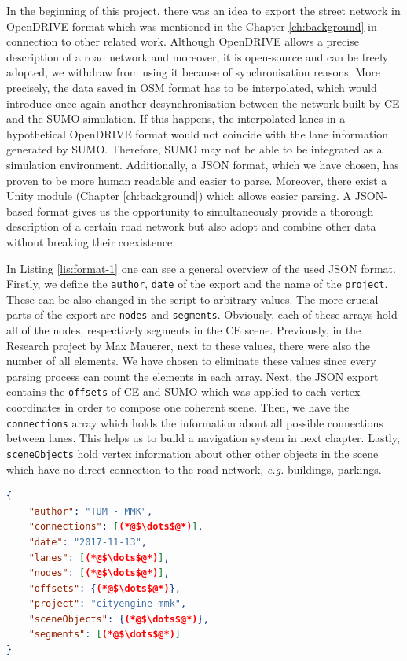 In the beginning of this project, there was an idea to export the street network in OpenDRIVE format which was mentioned in the Chapter \ref{ch:background} in connection to other related work. Although OpenDRIVE allows a precise description of a road network and moreover, it is open-source and can be freely adopted, we withdraw from using it because of synchronisation reasons. More precisely, the data saved in OSM format has to be interpolated\cite{shi2011automatic}, which would introduce once again another desynchronisation between the network built by CE and the SUMO simulation. If this happens, the interpolated lanes in a hypothetical OpenDRIVE format would not coincide with the lane information generated by SUMO. Therefore, SUMO may not be able to be integrated as a simulation environment. Additionally, a JSON format, which we have chosen, has proven to be more human readable and easier to parse. Moreover, there exist a Unity module (Chapter \ref{ch:background}) which allows easier parsing. A JSON-based format gives us the opportunity to simultaneously provide a thorough description of a certain road network but also adopt and combine other data without breaking their coexistence. 

In Listing \ref{lis:format-1} one can see a general overview of the used JSON format. Firstly, we define the \texttt{author}, \texttt{date} of the export and the name of the \texttt{project}. These can be also changed in the script to arbitrary values. The more crucial parts of the export are \texttt{nodes} and \texttt{segments}. Obviously, each of these arrays hold all of the nodes, respectively segments in the CE scene. Previously, in the Research project by Max Mauerer, next to these values, there were also the number of all elements. We have chosen to eliminate these values since every parsing process can count the elements in each array. Next, the JSON export contains the \texttt{offsets} of CE and SUMO which was applied to each vertex coordinates in order to compose one coherent scene. Then, we have the \texttt{connections} array which holds the information about all possible connections between lanes. This helps us to build a navigation system in next chapter. Lastly, \texttt{sceneObjects} hold vertex information about other other objects in the scene which have no direct connection to the road network, \emph{e.g.} buildings, parkings.\\

	\begin{lstlisting}[language=json,firstnumber=1,caption={General overview of the used JSON format for description of road networks.},label={lis:format-1}]
{
    "author": "TUM - MMK",
    "connections": [(*@$\dots$@*)],
    "date": "2017-11-13",
    "lanes": [(*@$\dots$@*)],
    "nodes": [(*@$\dots$@*)],
    "offsets": {(*@$\dots$@*)},
    "project": "cityengine-mmk",
    "sceneObjects": {(*@$\dots$@*)},
    "segments": [(*@$\dots$@*)]
}
	\end{lstlisting}

